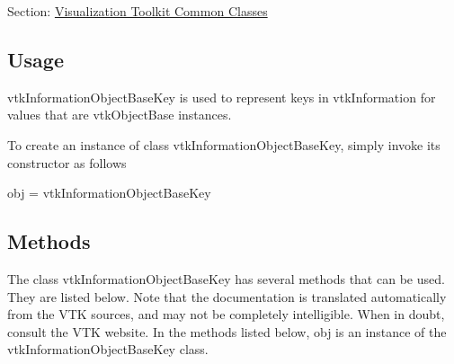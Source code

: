 Section\-: \hyperlink{sec_vtkcommon}{Visualization Toolkit Common Classes} \hypertarget{vtkwidgets_vtkxyplotwidget_Usage}{}\subsection{Usage}\label{vtkwidgets_vtkxyplotwidget_Usage}
vtk\-Information\-Object\-Base\-Key is used to represent keys in vtk\-Information for values that are vtk\-Object\-Base instances.

To create an instance of class vtk\-Information\-Object\-Base\-Key, simply invoke its constructor as follows \begin{DoxyVerb}  obj = vtkInformationObjectBaseKey
\end{DoxyVerb}
 \hypertarget{vtkwidgets_vtkxyplotwidget_Methods}{}\subsection{Methods}\label{vtkwidgets_vtkxyplotwidget_Methods}
The class vtk\-Information\-Object\-Base\-Key has several methods that can be used. They are listed below. Note that the documentation is translated automatically from the V\-T\-K sources, and may not be completely intelligible. When in doubt, consult the V\-T\-K website. In the methods listed below, {\ttfamily obj} is an instance of the vtk\-Information\-Object\-Base\-Key class. 

